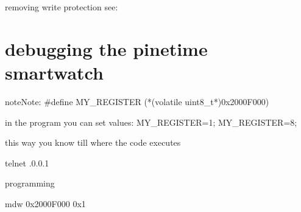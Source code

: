 \documentclass[letterpaper,10pt,english]{sphinxmanual}
\begin{document}
removing write protection see:   {\hyperref[\detokenize{hacking/writeprotection:flashing}]{}}


\section{debugging   the pinetime smartwatch}
\label{\detokenize{hacking/debugging:debugging-the-pinetime-smartwatch}}\label{\detokenize{hacking/debugging::doc}}
\begin{sphinxVerbatim}[commandchars=\\\{\}]
       
       
              
        
\end{sphinxVerbatim}

\begin{sphinxadmonition}{note}{Note:}
\#define MY\_REGISTER (*(volatile uint8\_t*)0x2000F000)

in the program you can set values:
MY\_REGISTER=1;
MY\_REGISTER=8;

this way you know till where the code executes
\end{sphinxadmonition}

\begin{sphinxVerbatim}[commandchars=\\\{\}]
telnet .0.0.1 
\end{sphinxVerbatim}

programming

\begin{sphinxVerbatim}[commandchars=\\\{\}]
\PYG{g+go}{Escape character is \PYGZsq{}\PYGZca{}]\PYGZsq{}.}
mdw 0x2000F000 0x1

\end{sphinxVerbatim}
\end{document}
